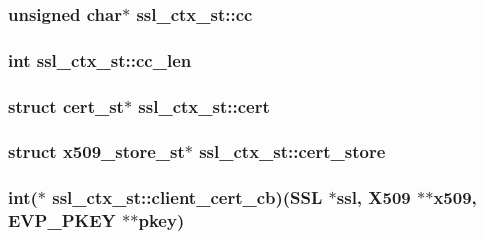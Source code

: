 \hypertarget{structssl__ctx__st_a71f1d6ce4538de67fc1abdcf6d94d5bf}{
\subsubsection[{cc}]{\setlength{\rightskip}{0pt plus 5cm}unsigned char$\ast$ ssl\-\_\-ctx\-\_\-st\-::cc}}\label{structssl__ctx__st_a71f1d6ce4538de67fc1abdcf6d94d5bf}
\hypertarget{structssl__ctx__st_a40817096561d718a10e6c5d8a05f0408}{
\subsubsection[{cc\-\_\-len}]{\setlength{\rightskip}{0pt plus 5cm}int ssl\-\_\-ctx\-\_\-st\-::cc\-\_\-len}}\label{structssl__ctx__st_a40817096561d718a10e6c5d8a05f0408}
\hypertarget{structssl__ctx__st_a12fd74ab996b83c38cd73136a1163471}{
\subsubsection[{cert}]{\setlength{\rightskip}{0pt plus 5cm}struct {\bf cert\-\_\-st}$\ast$ ssl\-\_\-ctx\-\_\-st\-::cert}}\label{structssl__ctx__st_a12fd74ab996b83c38cd73136a1163471}
\hypertarget{structssl__ctx__st_a8b6658b3bc3acb20908f2541056e3949}{
\subsubsection[{cert\-\_\-store}]{\setlength{\rightskip}{0pt plus 5cm}struct x509\-\_\-store\-\_\-st$\ast$ ssl\-\_\-ctx\-\_\-st\-::cert\-\_\-store}}\label{structssl__ctx__st_a8b6658b3bc3acb20908f2541056e3949}
\hypertarget{structssl__ctx__st_abb1883d320a908f6919b80e350d6c4f2}{
\subsubsection[{client\-\_\-cert\-\_\-cb}]{\setlength{\rightskip}{0pt plus 5cm}int($\ast$ ssl\-\_\-ctx\-\_\-st\-::client\-\_\-cert\-\_\-cb)(S\-S\-L $\ast$ssl, X509 $\ast$$\ast$x509, E\-V\-P\-\_\-\-P\-K\-E\-Y $\ast$$\ast$pkey)}}\label{structssl__ctx__st_abb1883d320a908f6919b80e350d6c4f2}
